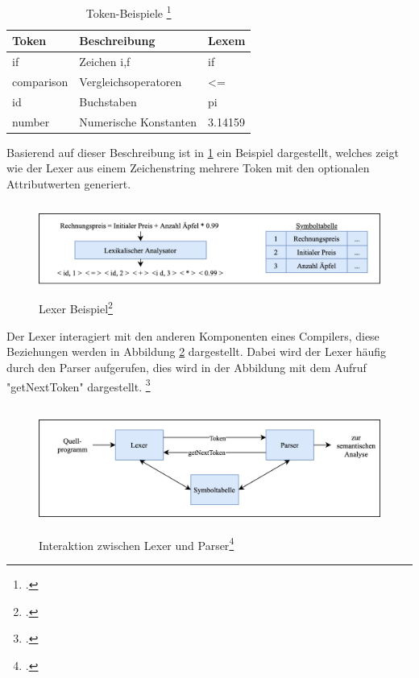 \begin{table}[!ht]
\begin{tabularx}{\textwidth}{l|X|l}
   \textbf{Token} & \textbf{Beschreibung} & \textbf{Lexem} \\
\hline
if             & Zeichen i,f           & if                      \\ 
comparison     & Vergleichsoperatoren  & \textless{}=            \\ 
id             & Buchstaben            & pi                      \\ 
number         & Numerische Konstanten    & 3.14159                  
\end{tabularx}
\caption[Token-Beispiele]{Token-Beispiele \protect\footcite{Ullmann2008}}
 \label{tab:Tokens}
\end{table}

Basierend auf dieser Beschreibung ist in \ref{fig:LexerResult} ein Beispiel dargestellt, welches zeigt wie der Lexer aus einem Zeichenstring mehrere Token mit den optionalen Attributwerten generiert.  
 
\begin{figure}[!ht]
 \includegraphics[width=14.5cm,height=3cm]{Images/Compiler/LexerResult.png}
 \caption[Lexer Beispiel]{Lexer Beispiel\protect\footcite{Ullmann2008}}
 \label{fig:LexerResult}
\end{figure}

Der Lexer interagiert mit den anderen Komponenten eines Compilers, diese  Beziehungen werden in Abbildung \ref{fig:LexerInteraktionen}  dargestellt.  Dabei wird der Lexer häufig durch den Parser aufgerufen,  dies wird in der Abbildung mit dem Aufruf "getNextToken" dargestellt.  \footcite[Vgl.][S. 135]{Ullmann2008} 

\begin{figure}[!ht]
 \includegraphics[width=14.5cm,height=4.11cm]{Images/Compiler/LexerParser.png}
 \caption[Interaktion zwischen Lexer und Parser]{Interaktion zwischen Lexer und Parser\protect\footcite{Ullmann2008}}
 \label{fig:LexerInteraktionen}
\end{figure}


